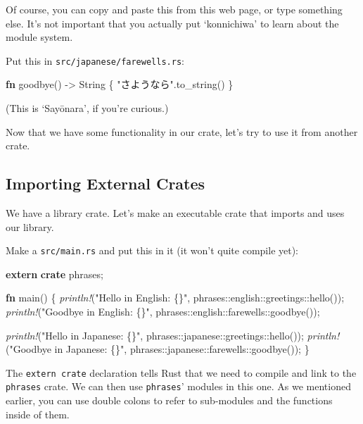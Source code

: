 \documentclass[a4paper,]{book}
\newenvironment{Shaded}{\begin{snugshade}}{\end{snugshade}}
\newcommand{\KeywordTok}[1]{\textcolor[rgb]{0.13,0.29,0.53}{\textbf{{#1}}}}
\newcommand{\DataTypeTok}[1]{\textcolor[rgb]{0.13,0.29,0.53}{{#1}}}
\newcommand{\StringTok}[1]{\textcolor[rgb]{0.31,0.60,0.02}{{#1}}}
\newcommand{\PreprocessorTok}[1]{\textcolor[rgb]{0.56,0.35,0.01}{\textit{{#1}}}}
\newcommand{\NormalTok}[1]{{#1}}
\begin{document}
Of course, you can copy and paste this from this web page, or type
something else. It's not important that you actually put `konnichiwa' to
learn about the module system.

Put this in \texttt{src/japanese/farewells.rs}:

\begin{Shaded}
\begin{Highlighting}[]
\KeywordTok{fn} \NormalTok{goodbye() -> }\DataTypeTok{String} \NormalTok{\{}
    \StringTok{"さようなら"}\NormalTok{.to_string()}
\NormalTok{\}}
\end{Highlighting}
\end{Shaded}

(This is `Sayōnara', if you're curious.)

Now that we have some functionality in our crate, let's try to use it
from another crate.

\subsection{Importing External Crates}\label{importing-external-crates}

We have a library crate. Let's make an executable crate that imports and
uses our library.

Make a \texttt{src/main.rs} and put this in it (it won't quite compile
yet):

\begin{Shaded}
\begin{Highlighting}[]
\KeywordTok{extern} \KeywordTok{crate} \NormalTok{phrases;}

\KeywordTok{fn} \NormalTok{main() \{}
    \PreprocessorTok{println!}\NormalTok{(}\StringTok{"Hello in English: \{\}"}\NormalTok{, phrases::english::greetings::hello());}
    \PreprocessorTok{println!}\NormalTok{(}\StringTok{"Goodbye in English: \{\}"}\NormalTok{, phrases::english::farewells::goodbye());}

    \PreprocessorTok{println!}\NormalTok{(}\StringTok{"Hello in Japanese: \{\}"}\NormalTok{, phrases::japanese::greetings::hello());}
    \PreprocessorTok{println!}\NormalTok{(}\StringTok{"Goodbye in Japanese: \{\}"}\NormalTok{, phrases::japanese::farewells::goodbye());}
\NormalTok{\}}
\end{Highlighting}
\end{Shaded}

The \texttt{extern\ crate} declaration tells Rust that we need to
compile and link to the \texttt{phrases} crate. We can then use
\texttt{phrases}' modules in this one. As we mentioned earlier, you can
use double colons to refer to sub-modules and the functions inside of
them.
\end{document}
